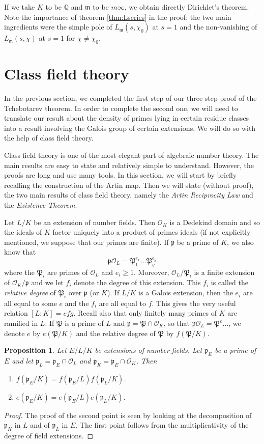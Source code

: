\documentclass[]{amsart}
\newtheorem{prop}{Proposition}
\newcommand{\Q}{\mathbb{Q}}
\newcommand{\m}{\mathfrak{m}}
\newcommand{\OK}{\mathcal{O}_K}
\newcommand{\OL}{\mathcal{O}_L}
\newcommand{\Lms}{L_\mathfrak{m}(s,\chi)}
\newcommand{\p}{\mathfrak{p}}
\renewcommand{\P}{\mathfrak{P}}
\begin{document}
		If we take $K$ to be $\Q$ and $\m$ to be $m\infty$, we obtain directly Dirichlet's theorem. Note the importance of theorem \ref{thm:Lseries} in the proof: the two main ingredients were the simple pole of $L_\m(s,\chi_0)$ at $s=1$ and the non-vanishing of $\Lms$ at $s=1$ for $\chi\neq\chi_0$.
		
		\section{Class field theory}
		In the previous section, we completed the first step of our three step proof of the Tchebotarev theorem. In order to complete the second one, we will need to translate our result about the density of primes lying in certain residue classes into a result involving the Galois group of certain extensions. We will do so with the help of class field theory. 
		
		Class field theory is one of the most elegant part of algebraic number theory. The main results are easy to state and relatively simple to understand. However, the proofs are long and use many tools. In this section, we will start by briefly recalling the construction of the Artin map. Then we will state (without proof), the two main results of class field theory, namely the \emph{Artin Reciprocity Law} and the \emph{Existence Theorem}.
		
		Let $L/K$ be an extension of number fields. Then $\OK$ is a Dedekind domain and so the ideals of $K$ factor uniquely into a product of primes ideals (if not explicitly mentioned, we suppose that our primes are finite).  If $\p$ be a prime of $K$, we also know that
		\[\p\OL=\P_1^{e_1}\dots\P_g^{e_g}\]
		where the $\P_i$ are primes of $\OL$ and $e_i\geq 1$. Moreover, $\OL/\P_i$ is a finite extension of $\OK/\p$ and we let $f_i$ denote the degree of this extension. This $f_i$ is called the \emph{relative degree} of $\P_i$ over $\p$ (or $K$). If $L/K$ is a Galois extension, then the $e_i$ are all equal to some $e$ and the $f_i$ are all equal to $f$. This gives the very useful relation $[L:K]=efg$. Recall also that only finitely many primes of $K$ are ramified in $L$. If $\P$ is a prime of $L$ and $\p=\P\cap\OK$, so that $\p\OL=\P^{e}\dots$, we denote $e$ by $e(\P/K)$ and the relative degree of $\P$ by $f(\P/K)$. 
		
		\begin{prop}
			Let $E/L/K$ be extensions of number fields. Let $\p_E$ be a prime of $E$ and let $\p_L=\p_E\cap\OL$ and $\p_K=\p_E\cap\OK$. Then 
			\begin{enumerate}
				\item $f(\p_E/K)=f(\p_E/L)f(\p_L/K)$.
				\item $e(\p_E/K)=e(\p_E/L)e(\p_L/K)$.
			\end{enumerate}
		\end{prop}
		\begin{proof}
			The proof of the second point is seen by looking at the decomposition of $\p_K$ in $L$ and of $\p_L$ in $E$. The first point follows from the multiplicativity of the degree of field extensions.
		\end{proof}
		
\end{document}
